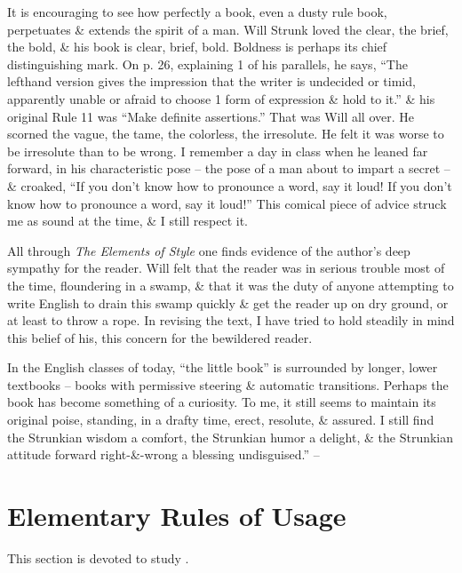 \documentclass[oneside]{book}
\numberwithin{equation}{section}
\begin{document}
It is encouraging to see how perfectly a book, even a dusty rule book, perpetuates \& extends the spirit of a man. Will Strunk loved the clear, the brief, the bold, \& his book is clear, brief, bold. Boldness is perhaps its chief distinguishing mark. On p. 26, explaining 1 of his parallels, he says, ``The lefthand version gives the impression that the writer is undecided or timid, apparently unable or afraid to choose 1 form of expression \& hold to it.'' \& his original Rule 11 was ``Make definite assertions.'' That was Will all over. He scorned the vague, the tame, the colorless, the irresolute. He felt it was worse to be irresolute than to be wrong. I remember a day in class when he leaned far forward, in his characteristic pose -- the pose of a man about to impart a secret -- \& croaked, ``If you don't know how to pronounce a word, say it loud! If you don't know how to pronounce a word, say it loud!'' This comical piece of advice struck me as sound at the time, \& I still respect it. 

All through \textit{The Elements of Style} one finds evidence of the author's deep sympathy for the reader. Will felt that the reader was in serious trouble most of the time, floundering in a swamp, \& that it was the duty of anyone attempting to write English to drain this swamp quickly \& get the reader up on dry ground, or at least to throw a rope. In revising the text, I have tried to hold steadily in mind this belief of his, this concern for the bewildered reader.

In the English classes of today, ``the little book'' is surrounded by longer, lower textbooks -- books with permissive steering \& automatic transitions. Perhaps the book has become something of a curiosity. To me, it still seems to maintain its original poise, standing, in a drafty time, erect, resolute, \& assured. I still find the Strunkian wisdom a comfort, the Strunkian humor a delight, \& the Strunkian attitude forward right-\&-wrong a blessing undisguised.'' -- \cite[Introduction (by E. B. White)]{Strunk_White2019}

\section{Elementary Rules of Usage}
This section is devoted to study \cite[Chap. 1]{Strunk_White2019}.
\end{document}
